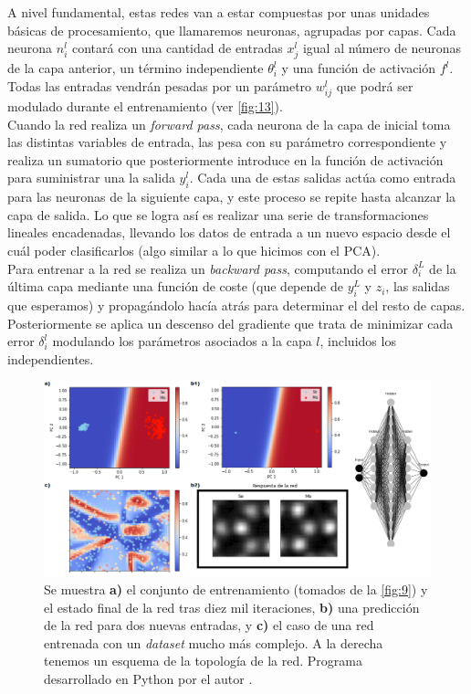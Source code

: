 A nivel fundamental, estas redes van a estar compuestas por unas unidades básicas de procesamiento, que llamaremos neuronas, agrupadas por capas. Cada neurona $n_i^l$ contará con una cantidad de entradas $x_j^l$ igual al número de neuronas de la capa anterior, un término independiente $\theta_i^l$ y una función de activación $f^l$. Todas las entradas vendrán pesadas por un parámetro $w_{ij}^l$ que podrá ser modulado durante el entrenamiento (ver \autoref{fig:13}).\\

Cuando la red realiza un \textit{forward pass}, cada neurona de la capa de inicial toma las distintas variables de entrada, las pesa con su parámetro correspondiente y realiza un sumatorio que posteriormente introduce en la función de activación para suministrar una la salida $y_i^l$. Cada una de estas salidas actúa como entrada para las neuronas de la siguiente capa, y este proceso se repite hasta alcanzar la capa de salida. Lo que se logra así es realizar una serie de transformaciones lineales encadenadas, llevando los datos de entrada a un nuevo espacio desde el cuál poder clasificarlos (algo similar a lo que hicimos con el PCA).\\

\newpage
Para entrenar a la red se realiza un \textit{backward pass}, computando el error $\delta_i^L $ de la última capa mediante una función de coste (que depende de $y_i^L$ y $z_i$, las salidas que esperamos) y propagándolo hacía atrás para determinar el del resto de capas. Posteriormente se aplica un descenso del gradiente que trata de minimizar cada error $\delta_i^l$ modulando los parámetros asociados a la capa $l$, incluidos los independientes.\\

\begin{figure}[h!]
    \centering
    \includegraphics[width=1\textwidth]{fig/Fig14.png}
    \caption{Se muestra \textbf{a)} el conjunto de entrenamiento (tomados de la \ref{fig:9}) y el estado final de la red tras diez mil iteraciones, \textbf{b)} una predicción de la red para dos nuevas entradas, y \textbf{c)} el caso de una red entrenada con un \textit{dataset} mucho más complejo. A la derecha tenemos un esquema de la topología de la red. Programa desarrollado en Python por el autor \cite{repo}.}
    \label{fig:14}
\end{figure}

